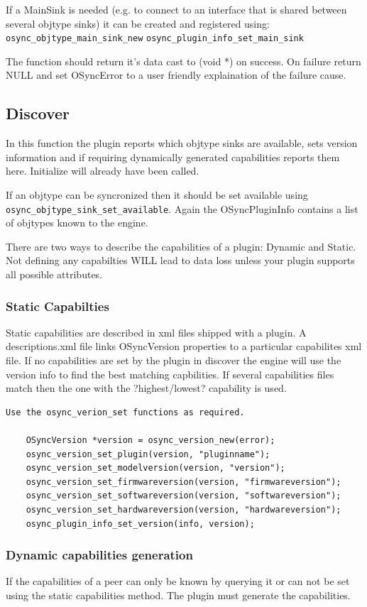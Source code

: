 If a MainSink is needed (e.g. to connect to an interface that is shared between
several objtype sinks) it can be created and registered using:
\verb|osync_objtype_main_sink_new| \verb|osync_plugin_info_set_main_sink|

The function should return it's data cast to (void *) on success.  On failure
return NULL and set OSyncError to a user friendly explaination of the failure
cause.
\subsection{Discover}
In this function the plugin reports which objtype sinks are available, sets
version information and if requiring dynamically generated capabilities reports
them here.  Initialize will already have been called.

If an objtype can be syncronized then it should be set available using
\verb|osync_objtype_sink_set_available|.  Again the OSyncPluginInfo contains a
list of objtypes known to the engine.

There are two ways to describe the capabilities of a plugin: Dynamic and Static.
Not defining any capabilties WILL lead to data loss unless your plugin supports
all possible attributes.
\subsubsection{Static Capabilties}
Static capabilities are described in xml files shipped with a plugin.  A
descriptions.xml file links OSyncVersion properties to a particular capabilites
xml file. If no capabilities are set by the plugin in discover the engine will
use the version info to find the best matching capbilities.  If several
capabilities files match then the one with the ?highest/lowest? capability is
used.

\begin{verbatim}
Use the osync_verion_set functions as required.

	OSyncVersion *version = osync_version_new(error);
	osync_version_set_plugin(version, "pluginname");
	osync_version_set_modelversion(version, "version");
	osync_version_set_firmwareversion(version, "firmwareversion");
	osync_version_set_softwareversion(version, "softwareversion");
	osync_version_set_hardwareversion(version, "hardwareversion");
	osync_plugin_info_set_version(info, version);
\end{verbatim}

\subsubsection{Dynamic capabilities generation}
If the capabilities of a peer can only be known by querying it or can not be set using the
static capabilities method. The plugin must generate the capabilities.

